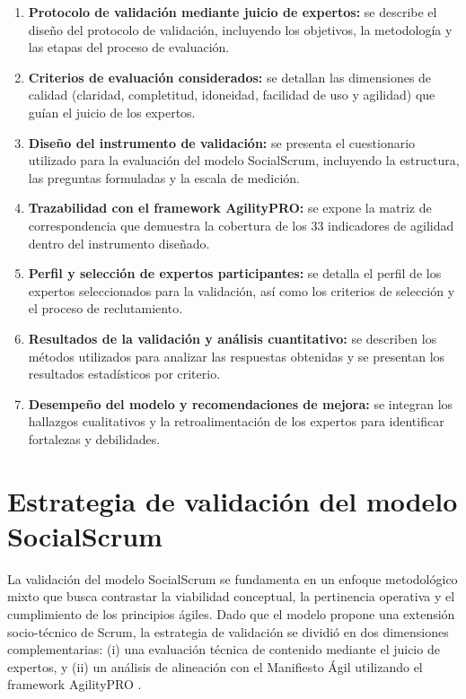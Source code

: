 \begin{enumerate}
    \item \textbf{Protocolo de validación mediante juicio de expertos:} se describe el diseño del protocolo de validación, incluyendo los objetivos, la metodología y las etapas del proceso de evaluación.
    \item \textbf{Criterios de evaluación considerados:} se detallan las dimensiones de calidad (claridad, completitud, idoneidad, facilidad de uso y agilidad) que guían el juicio de los expertos.
    \item \textbf{Diseño del instrumento de validación:} se presenta el cuestionario utilizado para la evaluación del modelo SocialScrum, incluyendo la estructura, las preguntas formuladas y la escala de medición.
    \item \textbf{Trazabilidad con el framework AgilityPRO:} se expone la matriz de correspondencia que demuestra la cobertura de los 33 indicadores de agilidad dentro del instrumento diseñado.
    \item \textbf{Perfil y selección de expertos participantes:} se detalla el perfil de los expertos seleccionados para la validación, así como los criterios de selección y el proceso de reclutamiento.
    \item \textbf{Resultados de la validación y análisis cuantitativo:} se describen los métodos utilizados para analizar las respuestas obtenidas y se presentan los resultados estadísticos por criterio.
    \item \textbf{Desempeño del modelo y recomendaciones de mejora:} se integran los hallazgos cualitativos y la retroalimentación de los expertos para identificar fortalezas y debilidades.
\end{enumerate}

\section{Estrategia de validación del modelo SocialScrum}
La validación del modelo SocialScrum se fundamenta en un enfoque metodológico mixto que busca contrastar la viabilidad conceptual, la pertinencia operativa y el cumplimiento de los principios ágiles. Dado que el modelo propone una extensión socio-técnico de Scrum, la estrategia de validación se dividió en dos dimensiones complementarias: (i) una evaluación técnica de contenido mediante el juicio de expertos, y (ii) un análisis de alineación con el Manifiesto Ágil utilizando el framework AgilityPRO \cite{ortega2019agilityevaluation}.

